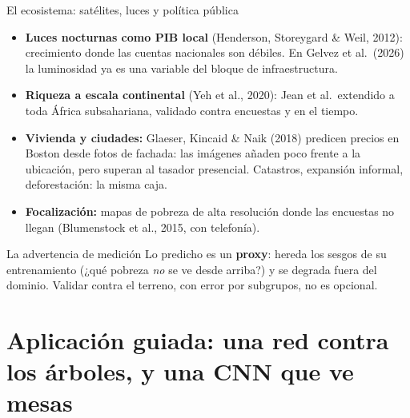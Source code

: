 \documentclass{beamer}
\newcommand{\1}{\mathbb{I}}
\begin{document}
\begin{frame}{El ecosistema: satélites, luces y política pública}
\small
\begin{itemize}\itemsep2pt
  \item \textbf{Luces nocturnas como PIB local} (Henderson, Storeygard \& Weil, 2012): crecimiento donde las cuentas nacionales son débiles. En Gelvez et al.\ (2026) la luminosidad ya es una variable del bloque de infraestructura. \pause
  \item \textbf{Riqueza a escala continental} (Yeh et al., 2020): Jean et al.\ extendido a toda África subsahariana, validado contra encuestas y en el tiempo. \pause
  \item \textbf{Vivienda y ciudades:} Glaeser, Kincaid \& Naik (2018) predicen precios en Boston desde fotos de fachada: las imágenes añaden poco frente a la ubicación, pero superan al tasador presencial. Catastros, expansión informal, deforestación: la misma caja. \pause
  \item \textbf{Focalización:} mapas de pobreza de alta resolución donde las encuestas no llegan (Blumenstock et al., 2015, con telefonía).
\end{itemize}
\pause
\begin{block}{La advertencia de medición}
Lo predicho es un \textbf{proxy}: hereda los sesgos de su entrenamiento (¿qué pobreza \emph{no} se ve desde arriba?) y se degrada fuera del dominio. Validar contra el terreno, con error por subgrupos, no es opcional.
\end{block}
\end{frame}


\section{Aplicación guiada: una red contra los árboles, y una CNN que ve mesas}
\begin{frame}[noframenumbering]
\tableofcontents[currentsection]
\end{frame}
\end{document}
